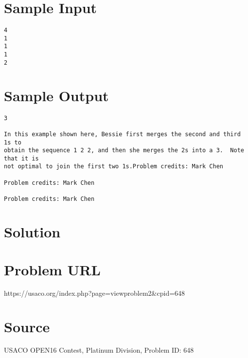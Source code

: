 \documentclass[12pt]{article}
\begin{document}
\section*{Sample Input}
\begin{verbatim}
4
1
1
1
2
\end{verbatim}

\section*{Sample Output}
\begin{verbatim}
3

In this example shown here, Bessie first merges the second and third 1s to
obtain the sequence 1 2 2, and then she merges the 2s into a 3.  Note that it is
not optimal to join the first two 1s.Problem credits: Mark Chen

Problem credits: Mark Chen

Problem credits: Mark Chen
\end{verbatim}

\section*{Solution}


\section*{Problem URL}
https://usaco.org/index.php?page=viewproblem2&cpid=648

\section*{Source}
USACO OPEN16 Contest, Platinum Division, Problem ID: 648
\end{document}
